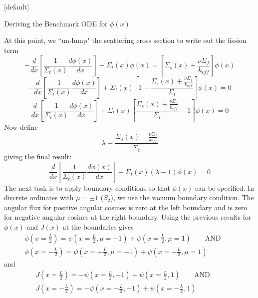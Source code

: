 \documentclass[9pt,t]{beamer}
\makeatletter
\newcommand{\QAND}{\qquad \text{AND} \qquad}
\newenvironment{withoutheadline}{
       \setbeamertemplate{headline}[default]
       \def\beamer@entrycode{\vspace*{-\headheight}}
    }{}
\makeatother
\begin{document}
\begin{withoutheadline}
\begin{frame}[allowframebreaks]{Deriving the Benchmark ODE for $\phi(x)$}
\begin{itemize}
        At this point, we ``un-lump" the scattering cross section to write out the fission term
        \begin{equation}
            -\frac{d}{dx}\left\lbrack\frac{1}{\Sigma_{t}(x)} \frac{d\phi(x)}{dx} \right\rbrack + \Sigma_{t}(x)\phi(x) =
            \left\lbrack\Sigma_{s}(x) + \frac{\nu \Sigma_{f}}{k_{eff}}\right\rbrack\phi(x)
        \end{equation}
        \begin{equation}
            -\frac{d}{dx}\left\lbrack\frac{1}{\Sigma_{t}(x)} \frac{d\phi(x)}{dx} \right\rbrack + \Sigma_{t}(x)
            \left\lbrack1 - \frac{\Sigma_{s}(x) + \frac{\nu \Sigma_{f}}{k_{eff}}}{\Sigma_{t}}\right\rbrack\phi(x) = 0
        \end{equation}
        \begin{equation}
            \frac{d}{dx}\left\lbrack\frac{1}{\Sigma_{t}(x)} \frac{d\phi(x)}{dx} \right\rbrack + \Sigma_{t}(x)
            \left\lbrack\frac{\Sigma_{s}(x) + \frac{\nu \Sigma_{f}}{k_{eff}}}{\Sigma_{t}} - 1\right\rbrack\phi(x) = 0
        \end{equation}
        Now define
        \begin{equation}
            \lambda \equiv \frac{\Sigma_{s}(x) + \frac{\nu \Sigma_{f}}{k_{eff}}}{\Sigma_{t}}
        \end{equation}
        giving the final result:
        \begin{equation}
            \frac{d}{dx}\left\lbrack\frac{1}{\Sigma_{t}(x)} \frac{d\phi(x)}{dx} \right\rbrack + \Sigma_{t}(x)
            \left(\lambda - 1\right)\phi(x) = 0
        \end{equation}
        \newpage
        The next task is to apply boundary conditions so that $\phi(x)$ can be specified. In discrete ordinates with $\mu=\pm1$ ($S_{2}$), we use the vacuum boundary condition. The angular flux for positive angular cosines is zero at the left boundary and is zero for negative angular cosines at the right boundary.
        Using the previous results for $\phi(x)$ and $J(x)$ at the boundaries gives
        \begin{multline}
            \phi(x=\frac{L}{2}) =  \psi(x=\frac{L}{2},\mu =-1) + \psi(x=\frac{L}{2},\mu =1) \QAND  \\ \phi(x=-\frac{L}{2}) =  \psi(x=-\frac{L}{2},\mu =-1) + \psi(x=-\frac{L}{2},\mu =1)
        \end{multline}
        and
        \begin{multline}
            J(x=\frac{L}{2}) = - \psi(x=\frac{L}{2},-1)  + \psi(x=\frac{L}{2},1) \QAND \\ J(x=-\frac{L}{2}) = - \psi(x=-\frac{L}{2},-1)  + \psi(x=-\frac{L}{2},1)

\end{multline}
\end{itemize}
\end{frame}
\end{withoutheadline}
\end{document}
